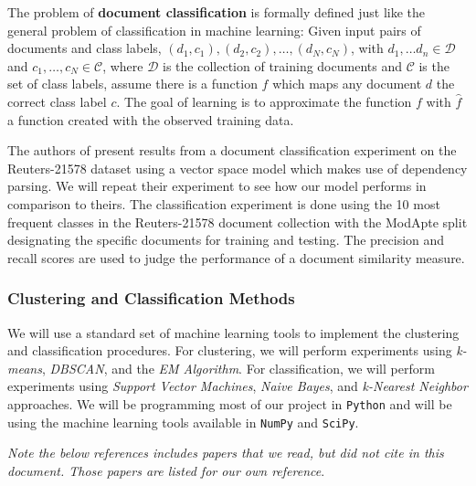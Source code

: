 \documentclass[11pt]{article}
\begin{document}
The problem of \textbf{document classification} is formally defined just like the general problem of classification in machine learning: Given input pairs of documents and class labels, $(d_1, c_1), (d_2, c_2), \dots, (d_N, c_N)$, with $d_1, \dots d_n \in \mathcal{D}$ and $c_1, \dots, c_N \in \mathcal{C}$, where  $\mathcal{D}$ is the collection of training documents and $\mathcal{C}$ is the set of class labels, assume there is a function $f$ which maps any document $d$ the correct class label $c$. The goal of learning is to approximate the function $f$ with $\hat{f}$ a function created with the observed training data. 

The authors of \cite{Nastase2007} present results from a document classification experiment on the Reuters-21578 dataset using a vector space model which makes use of dependency parsing. We will repeat their experiment to see how our model performs in comparison to theirs. The classification experiment is done using the 10 most frequent classes in the Reuters-21578 document collection with the ModApte split designating the specific documents for training and testing. The precision and recall scores are used to judge the performance of a document similarity measure. 

\subsubsection{Clustering and Classification Methods}

We will use a standard set of machine learning tools to implement the clustering and classification procedures. For clustering, we will perform experiments using \emph{k-means}, \emph{DBSCAN}, and the \emph{EM Algorithm}. For classification, we will perform experiments using \emph{Support Vector Machines}, \emph{Naive Bayes}, and \emph{k-Nearest Neighbor} approaches. We will be programming most of our project in {\tt Python} and will be using the machine learning tools available in {\tt NumPy} and {\tt SciPy}.

\bigskip
\bigskip

\emph{Note the below references includes papers that we read, but did not cite in this document. Those papers are listed for our own reference}.


\nocite{*}



  
  
\end{document}
